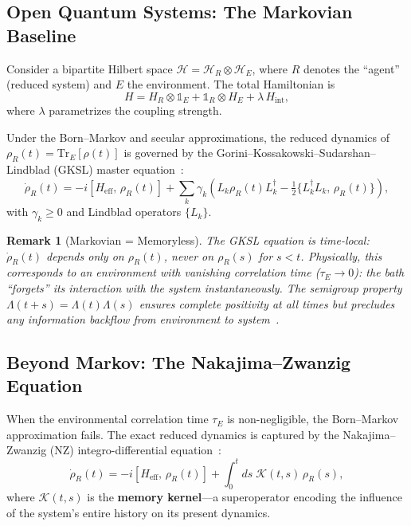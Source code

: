 \documentclass[12pt,a4paper,openany]{book}
\newtheorem{remark}[theorem]{Remark}
\begin{document}
\subsection{Open Quantum Systems: The Markovian Baseline}

Consider a bipartite Hilbert space
$\mathcal{H} = \mathcal{H}_R \otimes \mathcal{H}_E$,
where $R$ denotes the ``agent'' (reduced system) and $E$ the
environment. The total Hamiltonian is
\begin{equation}
\label{T-I-eq:H_total}
H = H_R \otimes \mathbb{1}_E
  + \mathbb{1}_R \otimes H_E
  + \lambda\, H_{\mathrm{int}},
\end{equation}
where $\lambda$ parametrizes the coupling strength.

Under the Born--Markov and secular approximations, the reduced
dynamics of $\rho_R(t) = \mathrm{Tr}_E[\rho(t)]$ is governed by
the Gorini--Kossakowski--Sudarshan--Lindblad (GKSL) master
equation~\cite{Lindblad1976,GKS1976}:
\begin{equation}
\label{T-I-eq:GKSL}
\dot{\rho}_R(t)
= -i[H_{\mathrm{eff}},\, \rho_R(t)]
  + \sum_k \gamma_k \left(
    L_k \rho_R(t) L_k^\dagger
    - \tfrac{1}{2}\{L_k^\dagger L_k,\, \rho_R(t)\}
  \right),
\end{equation}
with $\gamma_k \geq 0$ and Lindblad operators $\{L_k\}$.

\begin{remark}[Markovian = Memoryless]
\label{T-I-rem:markov}
The GKSL equation is \emph{time-local}: $\dot{\rho}_R(t)$ depends
only on $\rho_R(t)$, never on $\rho_R(s)$ for $s < t$.
Physically, this corresponds to an environment with vanishing
correlation time ($\tau_E \to 0$): the bath ``forgets'' its
interaction with the system instantaneously.
The semigroup property $\Lambda(t+s) = \Lambda(t)\Lambda(s)$
ensures complete positivity at all times but precludes any
information backflow from environment to system~\cite{RivasHuelgaPlenio2014}.
\end{remark}

\subsection{Beyond Markov: The Nakajima--Zwanzig Equation}

When the environmental correlation time $\tau_E$ is non-negligible,
the Born--Markov approximation fails. The exact reduced dynamics
is captured by the Nakajima--Zwanzig (NZ) integro-differential
equation~\cite{Nakajima1958,Zwanzig1960}:
\begin{equation}
\label{T-I-eq:NZ}
\dot{\rho}_R(t)
= -i[H_{\mathrm{eff}},\, \rho_R(t)]
  + \int_0^t ds\; \mathcal{K}(t,s)\, \rho_R(s),
\end{equation}
where $\mathcal{K}(t,s)$ is the \textbf{memory kernel}---a
superoperator encoding the influence of the system's entire
history on its present dynamics.
\end{document}
